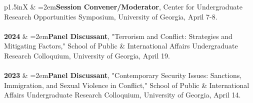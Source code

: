 \documentclass[letterpaper,12pt]{article}
\begin{document}
\begin{xltabular}{\dimexpr\textwidth-0in}{p{1.5in}X}
                     			& \hangindent=2em\textbf{Session Convener/Moderator}, Center for Undergraduate Research \mbox{Opportunities} \mbox{Symposium}, University of Georgia, April 7-8.\\ \\
                     
\textbf{2024} 			& \hangindent=2em\textbf{Panel Discussant}, "Terrorism and Conflict: Strategies and Mitigating Factors," School of Public \& International Affairs Undergraduate Research Colloquium, University of Georgia, April 19.\\  \\

\textbf{2023} 			& \hangindent=2em\textbf{Panel Discussant}, "Contemporary Security Issues: Sanctions, Immigration, and \mbox{Sexual} \mbox{Violence} in Conflict," School of Public \& International Affairs \mbox{Undergraduate} \mbox{Research} \mbox{Colloquium,} University of Georgia, April 14.\\ 
\end{xltabular}

\end{document}

